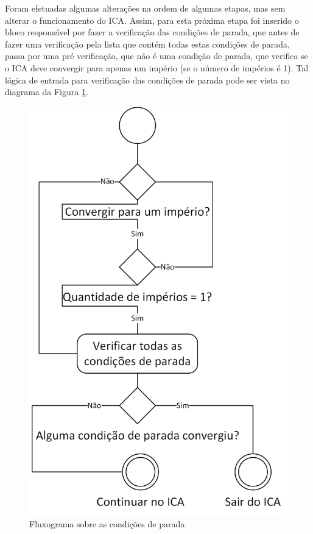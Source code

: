 Foram efetuadas algumas alterações na ordem de algumas etapas, mas sem alterar o funcionamento do ICA. Assim, para esta próxima etapa foi inserido o bloco responsável por fazer a verificação das condições de parada, que antes de fazer uma verificação pela lista que contém todas estas condições de parada, passa por uma pré verificação, que não é uma condição de parada, que verifica se o ICA deve convergir para apenas um império (se o número de impérios é 1). Tal lógica de entrada para verificação das condições de parada pode ser vista no diagrama da Figura \ref{fig:Fluxograms-StopConditions}.

 \begin{figure}[h]
	\centering	
	\includegraphics[scale=0.7]{Figuras/Fluxograms-StopConditions.png}
	\caption{Fluxograma sobre as condições de parada}
	\label{fig:Fluxograms-StopConditions}
	\end{figure}

